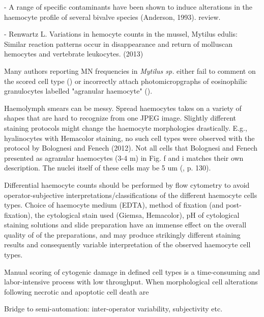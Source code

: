 - A range of specific contaminants have been shown to induce alterations in the haemocyte profile of several bivalve species 
   (Anderson, 1993). review.

- Renwartz L. Variations in hemocyte counts in the mussel, Mytilus edulis: Similar reaction patterns occur in disappearance and return of molluscan hemocytes and vertebrate leukocytes. (2013)



Many authors reporting MN frequencies in \emph{Mytilus sp.} either fail to comment on the scored cell type (\cite{Ale2019}) or incorrectly attach photomicropgraphs of eosinophilic granulocytes labelled "agranular haemocyte" (\cite{Meng2020}).


Haemolymph smears can be messy. Spread haemocytes takes on a variety of shapes that are hard to recognize from one JPEG image.
Slightly different staining protocols might change the haemocyte morphologies drastically. E.g., hyalinocytes with Hemacolor staining, no such cell types were observed with the protocol by Bolognesi and Fenech (2012). Not all cells that Bolognesi and Fenech presented as agranular haemocytes (3-4 \micro m) in Fig. f and i matches their own description. The nuclei itself of these cells may be 5 um (\cite{Carballal1997}, p. 130).


Differential haemocyte counts should be performed by flow cytometry to avoid operator-subjective interpretations/classifications of the different haemocyte cells types. Choice of haemocyte medium (EDTA), method of fixation (and post-fixation), the cytological stain used (Giemsa, Hemacolor), pH of cytological staining solutions and slide preparation have an immense effect on the overall quality of of the preparations, and may produce strikingly different staining results and consequently variable interpretation of the observed haemocyte cell types. 

Manual scoring of cytogenic damage in defined cell types is a time-consuming and labor-intensive process with low throughput. When morphological cell alterations following necrotic and apoptotic cell death are

Bridge to semi-automation: inter-operator variability, subjectivity etc.




